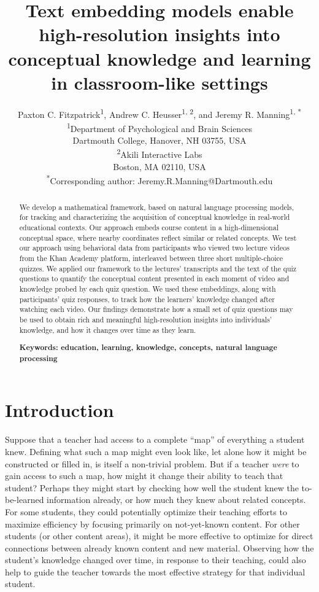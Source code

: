 \documentclass[10pt]{article}
\title{Text embedding models enable high-resolution insights into
conceptual knowledge and learning in classroom-like settings}
\author{Paxton C. Fitzpatrick\textsuperscript{1},
Andrew C. Heusser\textsuperscript{1, 2}, and Jeremy R.
Manning\textsuperscript{1, *}\\\small{\textsuperscript{1}Department of Psychological and Brain Sciences}\\\small{Dartmouth College, Hanover, NH 03755, USA}\\\small{\textsuperscript{2}Akili Interactive Labs}\\\small{Boston, MA 02110, USA}\\\small{\textsuperscript{*}Corresponding author:
Jeremy.R.Manning@Dartmouth.edu}}
\date{}
\begin{document}
\maketitle

\begin{abstract}\noindent We develop a mathematical framework, based on natural language
processing models, for tracking and characterizing the acquisition of
conceptual knowledge in real-world educational contexts. Our approach embeds
course content in a high-dimensional
conceptual space, where nearby coordinates reflect similar or related
concepts. We test our approach using behavioral data from participants who
viewed two lecture videos from the Khan Academy platform, interleaved
between three short multiple-choice quizzes. We applied our
framework to the lectures' transcripts and the text of the quiz questions to
quantify the conceptual content presented in each moment of video and knowledge probed by each quiz question. We used
these embeddings, along with participants' quiz responses, to track how the
learners' knowledge changed after watching each video. Our findings demonstrate how a
small set of quiz questions may be used to obtain rich and meaningful
high-resolution insights into individuals' knowledge, and how it
changes over time as they learn.

\textbf{Keywords: education, learning, knowledge, concepts, natural language processing}

\end{abstract}


\section*{Introduction}

Suppose that a teacher had access to a complete ``map'' of everything a
student knew. Defining what such a map might even look like, let alone how it
might be constructed or filled in, is itself a non-trivial problem. But if a
teacher \textit{were} to gain access to such a map, how might it change their
ability to teach that student? Perhaps they might start by checking how well the
student knew the to-be-learned information already, or how much they knew about
related concepts. For some students, they could potentially optimize their
teaching efforts to maximize efficiency by focusing primarily on not-yet-known
content. For other students (or other content areas), it might be more
effective to optimize for direct connections between already known content and
new material. Observing how the student's knowledge changed over time,
in response to their teaching, could also help to guide the teacher towards
the most effective strategy for that individual student.
\end{document}
